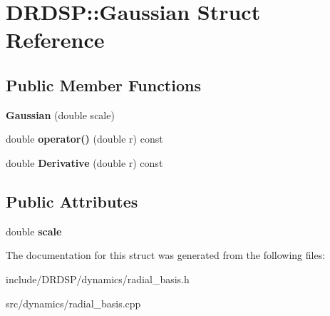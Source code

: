 \hypertarget{struct_d_r_d_s_p_1_1_gaussian}{\section{D\-R\-D\-S\-P\-:\-:Gaussian Struct Reference}
\label{struct_d_r_d_s_p_1_1_gaussian}
}
\subsection*{Public Member Functions}
\begin{DoxyCompactItemize}
\item 
\hypertarget{struct_d_r_d_s_p_1_1_gaussian_a3d61313f311f90c60eb62b018070639d}{{\bfseries Gaussian} (double scale)}\label{struct_d_r_d_s_p_1_1_gaussian_a3d61313f311f90c60eb62b018070639d}

\item 
\hypertarget{struct_d_r_d_s_p_1_1_gaussian_aff703aa9e683cce46f56a41d173d2643}{double {\bfseries operator()} (double r) const }\label{struct_d_r_d_s_p_1_1_gaussian_aff703aa9e683cce46f56a41d173d2643}

\item 
\hypertarget{struct_d_r_d_s_p_1_1_gaussian_a9ae975cdc5b2bbc1ae2e1c3725f48890}{double {\bfseries Derivative} (double r) const }\label{struct_d_r_d_s_p_1_1_gaussian_a9ae975cdc5b2bbc1ae2e1c3725f48890}

\end{DoxyCompactItemize}
\subsection*{Public Attributes}
\begin{DoxyCompactItemize}
\item 
\hypertarget{struct_d_r_d_s_p_1_1_gaussian_a54c0ec40d9295e0167e6216912f01d2a}{double {\bfseries scale}}\label{struct_d_r_d_s_p_1_1_gaussian_a54c0ec40d9295e0167e6216912f01d2a}

\end{DoxyCompactItemize}


The documentation for this struct was generated from the following files\-:\begin{DoxyCompactItemize}
\item 
include/\-D\-R\-D\-S\-P/dynamics/radial\-\_\-basis.\-h\item 
src/dynamics/radial\-\_\-basis.\-cpp\end{DoxyCompactItemize}
